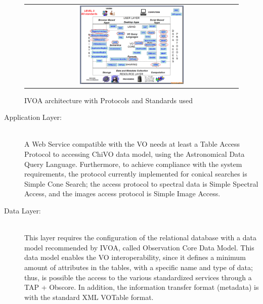 \documentclass[]{spie}
\begin{document}
\begin{figure}
   \begin{center}
   \begin{tabular}{c}
   \includegraphics[width=0.5\textwidth]{images/arquitectura_2.png}
   \end{tabular}
   \end{center}
   \caption[example]
   { \label{fig:ivoarch} IVOA architecture with Protocols and Standards used}
\end{figure}

\begin{description}
    \item[Application Layer:] \hfill \\
        A Web Service compatible with the VO needs at least a Table Access Protocol to accessing ChiVO data model, using the Astronomical Data Query Language.  Furthermore, to achieve compliance with the system requirements, the protocol currently implemented for conical searches is Simple Cone Search; the access protocol to spectral data is Simple Spectral Access, and the images access protocol is Simple Image Access. 
    \item[Data Layer:] \hfill \\
        This layer requires the configuration of the relational database with a data model recommended by IVOA, called Observation Core Data Model.  This data model enables the VO interoperability, since it defines a minimum amount of attributes in the tables, with a specific name and type of data; thus, is possible the access to the various standardized services through a TAP + Obscore.  In addition, the information transfer format (metadata) is with the standard XML VOTable format.
\end{description}
\end{document}
